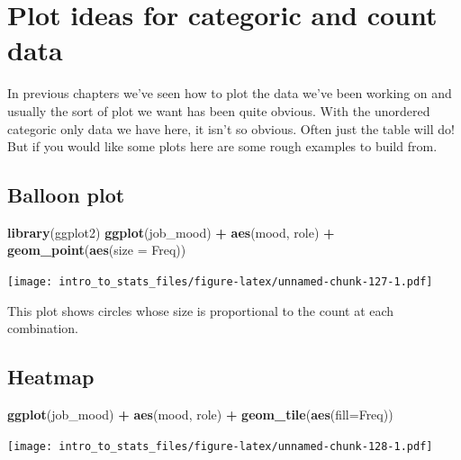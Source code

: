\documentclass[
]{book}
\newenvironment{Shaded}{\begin{snugshade}}{\end{snugshade}}
\newcommand{\DataTypeTok}[1]{\textcolor[rgb]{0.13,0.29,0.53}{#1}}
\newcommand{\KeywordTok}[1]{\textcolor[rgb]{0.13,0.29,0.53}{\textbf{#1}}}
\newcommand{\NormalTok}[1]{#1}
\newcommand{\OperatorTok}[1]{\textcolor[rgb]{0.81,0.36,0.00}{\textbf{#1}}}
\newcommand{\StringTok}[1]{\textcolor[rgb]{0.31,0.60,0.02}{#1}}
\begin{document}
\hypertarget{plot-ideas-for-categoric-and-count-data}{%
\section{Plot ideas for categoric and count data}\label{plot-ideas-for-categoric-and-count-data}}

In previous chapters we've seen how to plot the data we've been working on and usually the sort of plot we want has been quite obvious. With the unordered categoric only data we have here, it isn't so obvious. Often just the table will do! But if you would like some plots here are some rough examples to build from.

\hypertarget{balloon-plot}{%
\subsection{Balloon plot}\label{balloon-plot}}

\begin{Shaded}
\begin{Highlighting}[]
\KeywordTok{library}\NormalTok{(ggplot2)}
\KeywordTok{ggplot}\NormalTok{(job_mood) }\OperatorTok{+}\StringTok{ }\KeywordTok{aes}\NormalTok{(mood, role) }\OperatorTok{+}\StringTok{ }\KeywordTok{geom_point}\NormalTok{(}\KeywordTok{aes}\NormalTok{(}\DataTypeTok{size =}\NormalTok{ Freq))}
\end{Highlighting}
\end{Shaded}

\texttt{[image: intro\_to\_stats\_files/figure-latex/unnamed-chunk-127-1.pdf]}

This plot shows circles whose size is proportional to the count at each combination.

\hypertarget{heatmap}{%
\subsection{Heatmap}\label{heatmap}}

\begin{Shaded}
\begin{Highlighting}[]
\KeywordTok{ggplot}\NormalTok{(job_mood) }\OperatorTok{+}\StringTok{ }\KeywordTok{aes}\NormalTok{(mood, role) }\OperatorTok{+}\StringTok{ }\KeywordTok{geom_tile}\NormalTok{(}\KeywordTok{aes}\NormalTok{(}\DataTypeTok{fill=}\NormalTok{Freq))}
\end{Highlighting}
\end{Shaded}

\texttt{[image: intro\_to\_stats\_files/figure-latex/unnamed-chunk-128-1.pdf]}
\end{document}
